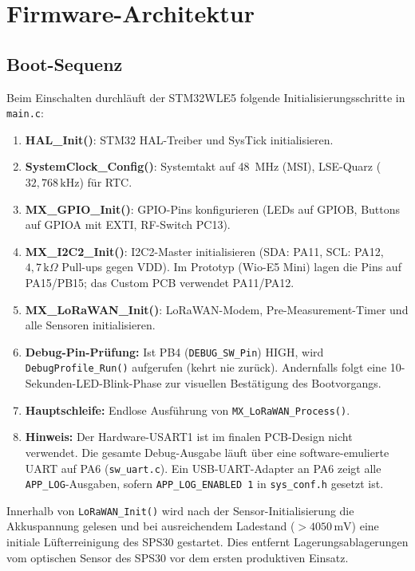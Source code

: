 \newpage

\section*{Firmware-Architektur}

\subsection*{Boot-Sequenz}

Beim Einschalten durchläuft der STM32WLE5 folgende Initialisierungsschritte in \texttt{main.c}:

\begin{enumerate}
  \item \textbf{HAL\_Init()}: STM32 HAL-Treiber und SysTick initialisieren.
  \item \textbf{SystemClock\_Config()}: Systemtakt auf 48~MHz (MSI), LSE-Quarz ($32{,}768\,\text{kHz}$) für RTC.
  \item \textbf{MX\_GPIO\_Init()}: GPIO-Pins konfigurieren (LEDs auf GPIOB, Buttons auf GPIOA mit EXTI, RF-Switch PC13).
  \item \textbf{MX\_I2C2\_Init()}: I2C2-Master initialisieren (SDA: PA11, SCL: PA12, $4{,}7\,\text{k}\Omega$ Pull-ups gegen VDD). Im Prototyp (Wio-E5 Mini) lagen die Pins auf PA15/PB15; das Custom PCB verwendet PA11/PA12.
  \item \textbf{MX\_LoRaWAN\_Init()}: LoRaWAN-Modem, Pre-Measurement-Timer und alle Sensoren initialisieren.
  \item \textbf{Debug-Pin-Prüfung:} Ist PB4 (\texttt{DEBUG\_SW\_Pin}) HIGH, wird \texttt{DebugProfile\_Run()} aufgerufen (kehrt nie zurück). Andernfalls folgt eine 10-Sekunden-LED-Blink-Phase zur visuellen Bestätigung des Bootvorgangs.
  \item \textbf{Hauptschleife:} Endlose Ausführung von \texttt{MX\_LoRaWAN\_Process()}.
  \item \textbf{Hinweis:} Der Hardware-USART1 ist im finalen PCB-Design nicht verwendet. Die gesamte Debug-Ausgabe läuft über eine software-emulierte UART auf PA6 (\texttt{sw\_uart.c}). Ein USB-UART-Adapter an PA6 zeigt alle \texttt{APP\_LOG}-Ausgaben, sofern \texttt{APP\_LOG\_ENABLED~1} in \texttt{sys\_conf.h} gesetzt ist.
\end{enumerate}

Innerhalb von \texttt{LoRaWAN\_Init()} wird nach der Sensor-Initialisierung die Akkuspannung gelesen und bei ausreichendem Ladestand ($> 4050\,\text{mV}$) eine initiale Lüfterreinigung des SPS30 gestartet. Dies entfernt Lagerungsablagerungen vom optischen Sensor des SPS30 vor dem ersten produktiven Einsatz.

